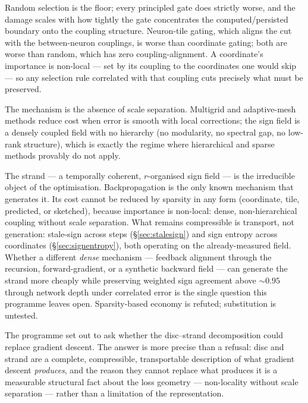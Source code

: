\begin{proposition}
Random selection is the floor; every principled gate does strictly worse, and
the damage scales with how tightly the gate concentrates the computed/persisted
boundary onto the coupling structure. Neuron-tile gating, which aligns the cut
with the between-neuron couplings, is worse than coordinate gating; both are
worse than random, which has zero coupling-alignment. A coordinate's importance
is non-local --- set by its coupling to the coordinates one would skip --- so
any selection rule correlated with that coupling cuts precisely what must be
preserved.
\end{proposition}

The mechanism is the absence of scale separation. Multigrid and adaptive-mesh
methods reduce cost when error is smooth with local corrections; the sign field
is a densely coupled field with no hierarchy (no modularity, no spectral gap, no
low-rank structure), which is exactly the regime where hierarchical and sparse
methods provably do not apply.

\begin{observation}
The strand --- a temporally coherent, $r$-organised sign field --- is the
irreducible object of the optimisation. Backpropagation is the only known
mechanism that generates it. Its cost cannot be reduced by sparsity in any form
(coordinate, tile, predicted, or sketched), because importance is non-local:
dense, non-hierarchical coupling without scale separation. What remains
compressible is transport, not generation: stale-sign across steps
(\S\ref{sec:stalesign}) and sign entropy across coordinates
(\S\ref{sec:signentropy}), both operating on the already-measured field. Whether
a different \emph{dense} mechanism --- feedback alignment through the recursion,
forward-gradient, or a synthetic backward field --- can generate the strand more
cheaply while preserving weighted sign agreement above $\sim\!0.95$ through
network depth under correlated error is the single question this programme
leaves open. Sparsity-based economy is refuted; substitution is untested.
\end{observation}

The programme set out to ask whether the disc--strand decomposition could
replace gradient descent. The answer is more precise than a refusal: disc and
strand are a complete, compressible, transportable description of what gradient
descent \emph{produces}, and the reason they cannot replace what produces it is
a measurable structural fact about the loss geometry --- non-locality without
scale separation --- rather than a limitation of the representation.

